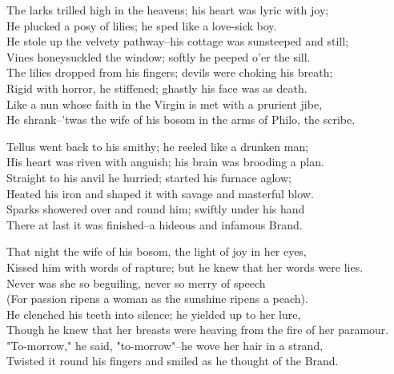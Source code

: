 \begin{poemblock}
The larks trilled high in the heavens; his heart was lyric with joy;\\
He plucked a posy of lilies; he sped like a love-sick boy.\\
He stole up the velvety pathway--his cottage was sunsteeped and still;\\
Vines honeysuckled the window; softly he peeped o'er the sill.\\
The lilies dropped from his fingers; devils were choking his breath;\\
Rigid with horror, he stiffened; ghastly his face was as death.\\
Like a nun whose faith in the Virgin is met with a prurient jibe,\\
He shrank--'twas the wife of his bosom in the arms of Philo, the scribe.

Tellus went back to his smithy; he reeled like a drunken man;\\
His heart was riven with anguish; his brain was brooding a plan.\\
Straight to his anvil he hurried; started his furnace aglow;\\
Heated his iron and shaped it with savage and masterful blow.\\
Sparks showered over and round him; swiftly under his hand\\
There at last it was finished--a hideous and infamous Brand.

That night the wife of his bosom, the light of joy in her eyes,\\
Kissed him with words of rapture; but he knew that her words were lies.\\
Never was she so beguiling, never so merry of speech\\
(For passion ripens a woman as the sunshine ripens a peach).\\
He clenched his teeth into silence; he yielded up to her lure,\\
Though he knew that her breasts were heaving from the fire of her paramour.\\
"To-morrow," he said, "to-morrow"--he wove her hair in a strand,\\
Twisted it round his fingers and smiled as he thought of the Brand.


\end{poemblock}
